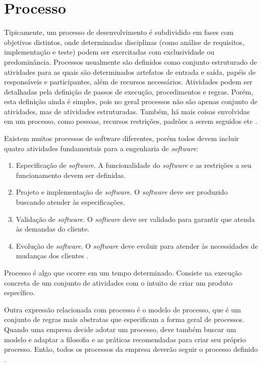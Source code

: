 \documentclass[12pt]{article}
\begin{document}
\section{Processo}

Tipicamente, um processo de desenvolvimento é subdividido em fases com objetivos distintos, onde determinadas disciplinas (como análise de requisitos, implementação e teste) podem ser exercitadas com exclusividade ou predominância. Processos usualmente são definidos como conjunto estruturado de atividades para as quais são determinados artefatos de entrada e saída, papéis de responsáveis e participantes, além de recursos necessários. Atividades podem ser detalhadas pela definição de passos de execução, procedimentos e regras. Porém, esta definição ainda é simples, pois no geral processos não são apenas conjunto de atividades, mas de atividades estruturadas. Também, há mais coisas envolvidas em um processo, como pessoas, recursos restrições, padrões a serem seguidos etc \cite{wazlawick2013engenharia}.

Existem muitos processos de software diferentes, porém todos devem incluir quatro atividades fundamentais para a engenharia de \textit{software}:
\begin{enumerate}
    \item Especificação de \textit{software}. A funcionalidade do \textit{software} e as restrições a seu funcionamento devem ser definidas.
    \item Projeto e implementação de \textit{software}. O \textit{software} deve ser produzido buscando atender às especificações.
    \item Validação de \textit{software}. O \textit{software} deve ser validado para garantir que atenda às demandas do cliente.
    \item Evolução de \textit{software}. O \textit{software} deve evoluir para atender às necessidades de mudanças dos clientes \cite{sommerville2007engenharia}.
\end{enumerate}

Processo é algo que ocorre em um tempo determinado. Consiste na execução concreta de um conjunto de atividades com o intuito de criar um produto específico\cite{wazlawick2013engenharia}.

Outra expressão relacionada com processo é o modelo de processo, que é um conjunto de regras mais abstratas que especificam a forma geral de processos. Quando uma empresa decide adotar um processo, deve também buscar um modelo e adaptar a filosofia e as práticas recomendadas para criar seu próprio processo. Então, todos os processos da empresa deverão seguir o processo definido \cite{wazlawick2013engenharia}.
\end{document}

